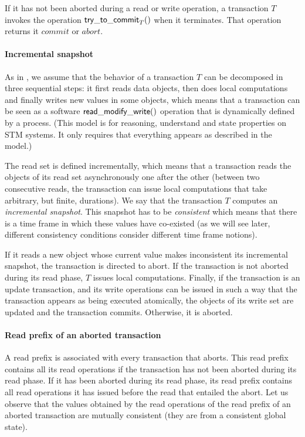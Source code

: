 If  it  has  not  been  aborted  during a  read  or  write  operation,    a
transaction $T$ invokes  the operation ${\sf try\_to\_commit}_T()$ when 
it terminates. That operation returns it $commit$ or $abort$. 



\paragraph{Incremental snapshot}
As  in \cite{BSW79},  we assume  that the behavior of a transaction $T$  
can be decomposed in  three sequential steps:  
it first reads  data objects,  then does local computations and 
finally   writes  new values  in some  objects, which means
that  a  transaction can  be  seen as  a software 
${\sf read\_modify\_write()}$ operation that is 
dynamically defined  by  a process. (This model is for 
reasoning, understand and  state properties on STM systems.  
It only requires that everything appears as described  in the model.)


The read set is  defined  incrementally,  which  means  that a 
transaction  reads  the objects of  its read set  asynchronously  one after
the other (between  two consecutive reads, the transaction 
can  issue local  computations   that  take  arbitrary, but finite,
durations). We  say  that the  transaction $T$ computes an  {\it incremental
snapshot}.  This snapshot has to be {\it consistent} which
means that there is a time frame in which these values have co-existed 
(as we will see later, different consistency conditions consider different  
time frame  notions). 

If it reads  a  new  object whose  current  value makes  inconsistent  its 
incremental snapshot, the transaction   is  directed to  abort. 
If the transaction is not aborted during its read 
phase, $T$ issues local computations. Finally,  if the transaction  is  
an update transaction, and its  write operations  can be issued 
in  such a way that the transaction  appears as  being executed
atomically,   the objects of its write set are updated  and the transaction
 commits.   Otherwise, it  is  aborted.

\paragraph{Read prefix of an aborted transaction}
A read prefix is associated with every transaction that aborts.
This read prefix contains all its read operations if the transaction 
has not been aborted  during its read phase.  If it has been  aborted during 
its read phase, its read prefix contains all read operations it has issued 
before the read that entailed the abort.  Let us observe that the values 
obtained by the read operations of the read prefix of an aborted transaction 
are mutually consistent (they are from a consistent global state). 


